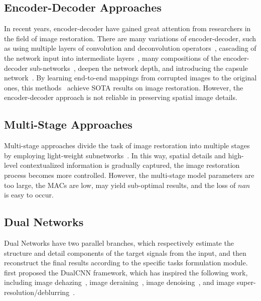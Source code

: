 \documentclass[lettersize,journal]{IEEEtran}
\begin{document}
\subsection{Encoder-Decoder Approaches} 
In recent years, encoder-decoder have gained great attention from researchers in the field of image restoration. There are many variations of encoder-decoder, such as using multiple layers of convolution and deconvolution operators~\cite{2016Imagenip}, cascading of the network input into intermediate layers~\cite{Mastan2019MultiLevelEA}, many compositions of the encoder-decoder sub-networks~\cite{2022As}, deepen the  network depth, and introducing the capsule network~\cite{2020RedCap}. By learning end-to-end mappings from corrupted images to the original ones, this methods~\cite{Zamir2021MPRNet,Zamir2021Restormer,2020arXiv201215028C} achieve SOTA results on image restoration. However, the encoder-decoder approach is not reliable in preserving spatial image details.

\subsection{Multi-Stage Approaches} 
Multi-stage approaches divide the task of image restoration into multiple stages by employing light-weight subnetworks~\cite{2018Scale,2018Lightweight,RESCAN,PREnet,Zamir2021MPRNet,zhang2022event,Zhang_2019_CVPR}. In this way, spatial details and high-level contextualized information is gradually captured, the image restoration process becomes more controlled. However, the multi-stage model parameters are too large, the MACs are low, may yield sub-optimal results, and the loss of $nan$ is easy to occur. 

\subsection{Dual Networks} 
 Dual Networks have two parallel branches, which respectively estimate the structure and detail components of the target signals from the input, and then reconstruct the final results according to the specific tasks formulation module. \cite{2018LearningD}first proposed the DualCNN framework, which has inspired the following work, including image dehazing~\cite{2018DehazeGAN,2019Dense,2019Dual}, image deraining~\cite{2018Fast}, image denoising~\cite{tian2021designing}, and image super-resolution/deblurring~\cite{2020Refining}. 
\end{document}
